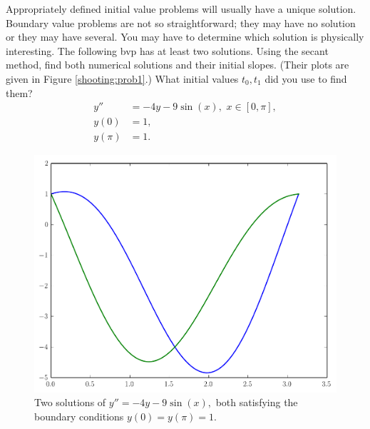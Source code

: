 

\begin{problem} Appropriately defined initial value problems will usually have a unique solution. Boundary value problems are not so straightforward; they may have no solution or they may have several. You may have to determine which solution is physically interesting. The following bvp has at least two solutions. Using the secant method, find both numerical solutions and their initial slopes. (Their plots are given in Figure \eqref{shooting:prob1}.) What initial values $t_0, t_1$ did you use to find them?
\begin{equation*}
\begin{split}
y'' &= -4y -9\sin(x), \,\, x \in [0,\pi],\\
y(0) &= 1, \\
y(\pi) &=1.
\end{split}
\end{equation*}

\end{problem}


\begin{figure}[ht]
\centering
\includegraphics[width=\textwidth]{Fig1.pdf}
\caption{Two solutions of $y'' = -4y -9\sin(x),$ both satisfying the boundary conditions $y(0) = y(\pi) = 1.$}
\label{shooting:prob1}
\end{figure}

